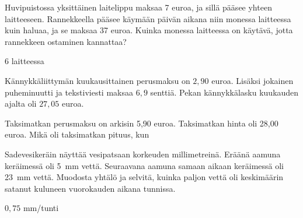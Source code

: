 \begin{tehtavasivu}
\begin{tehtava}
Huvipuistossa yksittäinen laitelippu maksaa 7 euroa, ja sillä pääsee yhteen laitteeseen. Rannekkeella pääsee käymään päivän aikana niin monessa laitteessa kuin haluaa, ja se maksaa 37 euroa. Kuinka monessa laitteessa on käytävä, jotta rannekkeen ostaminen kannattaa?
\begin{vastaus}
$6$ laitteessa
\end{vastaus}
\end{tehtava}

\begin{tehtava}
Kännykkäliittymän kuukausittainen perusmaksu on $2,90$ euroa. Lisäksi jokainen puheminuutti ja tekstiviesti maksaa $6,9$ senttiä. Pekan kännykkälasku kuukauden
ajalta oli $27,05$ euroa.

\begin{alakohdat}
\end{alakohdat}

	\begin{vastaus}
		\begin{alakohdat}
		\end{alakohdat}
	\end{vastaus}
\end{tehtava}

\begin{tehtava}
 Taksimatkan perusmaksu on arkisin 5,90 euroa. Taksimatkan hinta oli 28,00 euroa. Mikä oli taksimatkan pituus, kun
\begin{alakohdat}
\end{alakohdat}
	\begin{vastaus}
		\begin{alakohdat}
			\alakohta{14,5 kilometriä}
			\alakohta{10,4 kilometriä}
		\end{alakohdat}
	\end{vastaus}
\end{tehtava}


\begin{tehtava}
Sadevesikeräin näyttää vesipatsaan korkeuden millimetreinä. Eräänä aamuna
keräimessä oli 5~mm vettä. Seuraavana aamuna samaan aikaan keräimessä oli 23~mm vettä. Muodosta yhtälö ja selvitä, kuinka paljon vettä oli keskimäärin satanut kuluneen vuorokauden aikana tunnissa.
	\begin{vastaus}
	$0,75$ mm/tunti
	\end{vastaus}
\end{tehtava}


\end{tehtavasivu}
